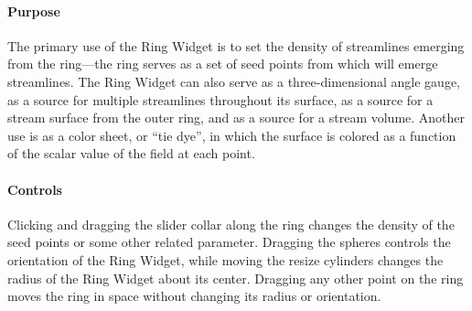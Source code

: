 \paragraph{Purpose} The primary use of the Ring Widget is to set the
density of streamlines emerging from the ring---the ring serves as a set of
seed points from which will emerge streamlines.  The Ring Widget can also
serve as a three-dimensional angle gauge, as a source for multiple
streamlines throughout its surface, as a source for a stream surface from
the outer ring, and as a source for a stream volume.  Another use is as a
color sheet, or ``tie dye'', in which the surface is colored as a function of
the scalar value of the field at each point.

\paragraph{Controls} Clicking and dragging the slider collar along the
ring changes the density of the seed points or some other related
parameter.  Dragging the spheres controls the orientation of the Ring
Widget, while moving the resize cylinders changes the radius of the Ring
Widget about its center.  Dragging any other point on the ring moves the
ring in space without changing its radius or orientation.


